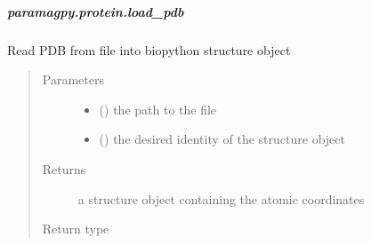 \documentclass[a4paper,10pt,english,openany,oneside]{sphinxmanual}
\begin{document}
\subparagraph{paramagpy.protein.load\_pdb}
\label{\detokenize{reference/generated/paramagpy.protein.load_pdb:paramagpy-protein-load-pdb}}\label{\detokenize{reference/generated/paramagpy.protein.load_pdb::doc}}

\begin{fulllineitems}
\label{\detokenize{reference/generated/paramagpy.protein.load_pdb:paramagpy.protein.load_pdb}}
\sphinxAtStartPar
Read PDB from file into biopython structure object
\begin{quote}\begin{description}
\item[{Parameters}] \leavevmode\begin{itemize}
\item {} 
\sphinxAtStartPar
{} () \textendash{} the path to the file

\item {} 
\sphinxAtStartPar
{} (\sphinxstyleliteralemphasis{\sphinxupquote{ (}}\sphinxstyleliteralemphasis{\sphinxupquote{)}}) \textendash{} the desired identity of the structure object

\end{itemize}

\item[{Returns}] \leavevmode
\sphinxAtStartPar
{} \textendash{} a structure object containing the atomic coordinates

\item[{Return type}] \leavevmode
\sphinxAtStartPar
{\hyperref[\detokenize{reference/generated/paramagpy.protein.CustomStructure:paramagpy.protein.CustomStructure}]{}}

\end{description}\end{quote}

\end{fulllineitems}
\end{document}
